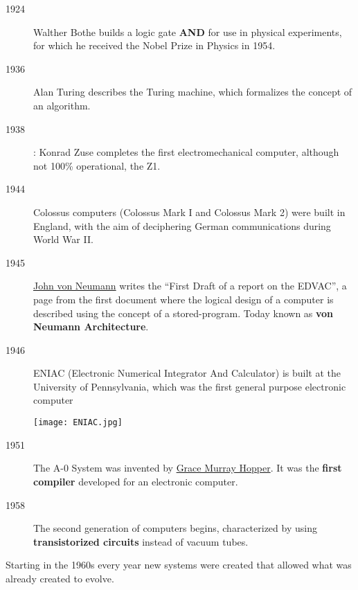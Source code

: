 \begin{description}
    \item [1924] Walther Bothe builds a logic gate \textbf {AND} for use in physical experiments, for which he received the Nobel Prize in Physics in 1954.

    \item[1936] Alan Turing describes the Turing machine, which formalizes the concept of an algorithm.

    \item[1938]: Konrad Zuse completes the first electromechanical computer, although not 100\% operational, the Z1.

    \item[1944] Colossus computers (Colossus Mark I and Colossus Mark 2) were built in England, with the aim of deciphering German communications during World War II.

    \item[1945] \href{https://es.wikipedia.org/wiki/John_von_Neumann}{John von Neumann} writes the “First Draft of a report on the EDVAC”, a page from the first document where the logical design of a computer is described using the concept of a stored-program. Today known as \textbf{von Neumann Architecture}.

    \item[1946] ENIAC (Electronic Numerical Integrator And Calculator) is built at the University of Pennsylvania, which was the first general purpose electronic computer

    \begin{center}
        \texttt{[image: ENIAC.jpg]}
    \end{center}

    \item[1951] The A-0 System was invented by \href{https://en.wikipedia.org/wiki/Grace_Murray_Hopper}{Grace Murray Hopper}. It was the \textbf{first compiler} developed for an electronic computer.

    \item[1958] The second generation of computers begins, characterized by using \textbf{transistorized circuits} instead of vacuum tubes.
\end{description}

Starting in the 1960s every year new systems were created that allowed what was already created to evolve.

